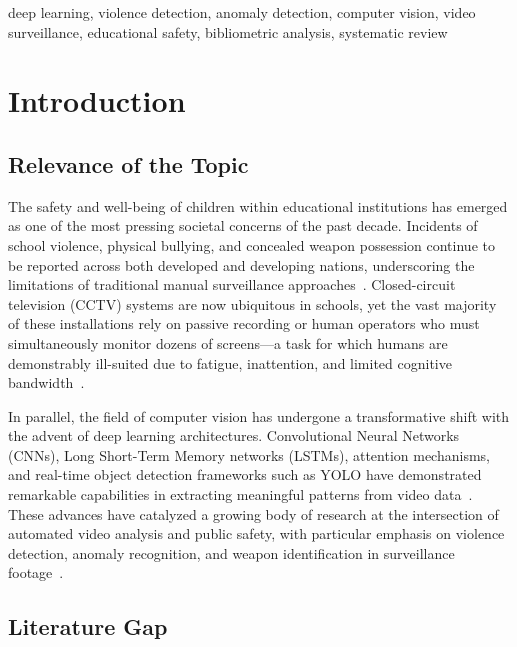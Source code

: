 \documentclass[conference]{IEEEtran}
\begin{document}
\begin{IEEEkeywords}
deep learning, violence detection, anomaly detection, computer vision, video surveillance, educational safety, bibliometric analysis, systematic review
\end{IEEEkeywords}

\section{Introduction}

\subsection{Relevance of the Topic}

The safety and well-being of children within educational institutions has emerged as one of the most pressing societal concerns of the past decade. Incidents of school violence, physical bullying, and concealed weapon possession continue to be reported across both developed and developing nations, underscoring the limitations of traditional manual surveillance approaches~\cite{b1,b2}. Closed-circuit television (CCTV) systems are now ubiquitous in schools, yet the vast majority of these installations rely on passive recording or human operators who must simultaneously monitor dozens of screens---a task for which humans are demonstrably ill-suited due to fatigue, inattention, and limited cognitive bandwidth~\cite{b3,b4}.

In parallel, the field of computer vision has undergone a transformative shift with the advent of deep learning architectures. Convolutional Neural Networks (CNNs), Long Short-Term Memory networks (LSTMs), attention mechanisms, and real-time object detection frameworks such as YOLO have demonstrated remarkable capabilities in extracting meaningful patterns from video data~\cite{b5,b6,b7}. These advances have catalyzed a growing body of research at the intersection of automated video analysis and public safety, with particular emphasis on violence detection, anomaly recognition, and weapon identification in surveillance footage~\cite{b8,b9,b10}.

\subsection{Literature Gap}
\end{document}
